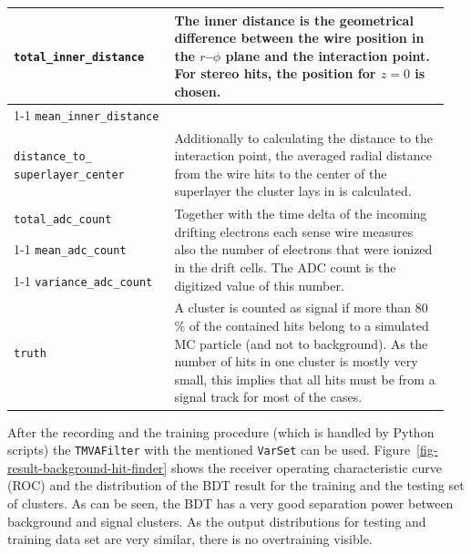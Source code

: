 \begin{table}
\begin{tabular}{p{0.35\linewidth}p{0.60\linewidth}}
   \verb+total_inner_distance+ & \multirow{3}{*}[-1.5pt]{\begin{minipage}{\linewidth} The inner distance is the geometrical difference between the wire position in the $r$--$\phi$ plane and the interaction point. For stereo hits, the position for $z = 0$ is chosen. \end{minipage}} \\[1ex] \cmidrule{1-1}
   \verb+mean_inner_distance+ & \\[1ex] \midrule
   \verb+distance_to_+ \verb+superlayer_center+ & Additionally to calculating the distance to the interaction point, the averaged radial distance from the wire hits to the center of the superlayer the cluster lays in is calculated. \\ \midrule 
   
   \verb+total_adc_count+ & \multirow{3}{*}[-1pt]{\begin{minipage}{\linewidth} Together with the time delta of the incoming drifting electrons each sense wire measures also the number of electrons that were ionized in the drift cells. The ADC count is the digitized value of this number. \end{minipage}} \\ \cmidrule{1-1}
   \verb+mean_adc_count+ & \\ \cmidrule{1-1}
   \verb+variance_adc_count+ & \\ \midrule
   \verb+truth+ & A cluster is counted as signal if more than 80 \% of the contained hits belong to a simulated MC particle (and not to background). As the number of hits in one cluster is mostly very small, this implies that all hits must be from a signal track for most of the cases. \\ \bottomrule
  \end{tabular}

  \label{tab-varset-cluster}
\end{table}

After the recording and the training procedure (which is handled by Python scripts) the \texttt{TMVAFilter} with the mentioned \texttt{VarSet} can be used. Figure~\ref{fig-result-background-hit-finder} shows the receiver operating characteristic curve (ROC) and the distribution of the BDT result for the training and the testing set of clusters. As can be seen, the BDT has a very good separation power between background and signal clusters. As the output distributions for testing and training data set are very similar, there is no overtraining visible.

